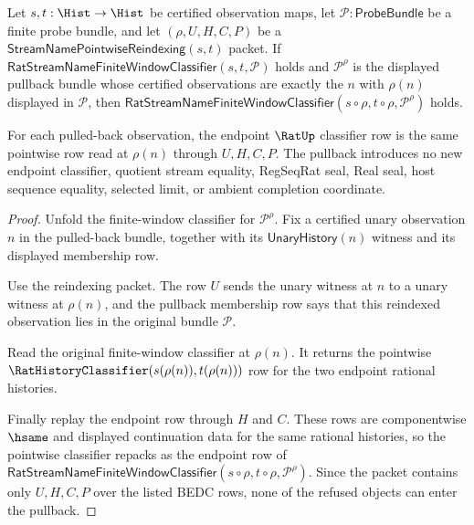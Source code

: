 \begin{theorem}
\label{thm:streamname-finite-window-pullback-stability}
Let $s,t:\Hist\to\Hist$ be certified observation maps, let $\mathcal{P}:\mathsf{ProbeBundle}$ be a finite probe bundle, and let $(\rho,U,H,C,P)$ be a $\mathsf{StreamNamePointwiseReindexing}(s,t)$ packet. If $\mathsf{RatStreamNameFiniteWindowClassifier}(s,t,\mathcal{P})$ holds and $\mathcal{P}^{\rho}$ is the displayed pullback bundle whose certified observations are exactly the $n$ with $\rho(n)$ displayed in $\mathcal{P}$, then $\mathsf{RatStreamNameFiniteWindowClassifier}(s\circ\rho,t\circ\rho,\mathcal{P}^{\rho})$ holds.

For each pulled-back observation, the endpoint $\RatUp$ classifier row is the same pointwise row read at $\rho(n)$ through $U,H,C,P$. The pullback introduces no new endpoint classifier, quotient stream equality, RegSeqRat seal, Real seal, host sequence equality, selected limit, or ambient completion coordinate.
\end{theorem}
\begin{proof}
Unfold the finite-window classifier for $\mathcal{P}^{\rho}$. Fix a certified unary observation $n$ in the pulled-back bundle, together with its $\mathsf{UnaryHistory}(n)$ witness and its displayed membership row.

Use the reindexing packet. The row $U$ sends the unary witness at $n$ to a unary witness at $\rho(n)$, and the pullback membership row says that this reindexed observation lies in the original bundle $\mathcal{P}$.

Read the original finite-window classifier at $\rho(n)$. It returns the pointwise $\RatHistoryClassifier(s(\rho(n)),t(\rho(n)))$ row for the two endpoint rational histories.

Finally replay the endpoint row through $H$ and $C$. These rows are componentwise $\hsame$ and displayed continuation data for the same rational histories, so the pointwise classifier repacks as the endpoint row of $\mathsf{RatStreamNameFiniteWindowClassifier}(s\circ\rho,t\circ\rho,\mathcal{P}^{\rho})$. Since the packet contains only $U,H,C,P$ over the listed BEDC rows, none of the refused objects can enter the pullback.
\end{proof}

